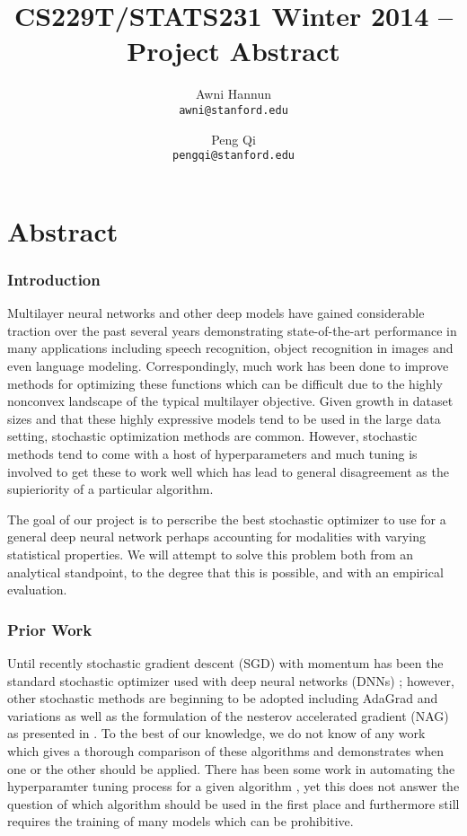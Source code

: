 \documentclass[12pt,english]{article}
\title{
CS229T/STATS231 Winter 2014 -- Project Abstract
}
\author{
Awni Hannun \\
\texttt{awni@stanford.edu}
\and
Peng Qi \\
\texttt{pengqi@stanford.edu}
}
\newcommand{\1}{\mathbb{I}} %
\begin{document}
\maketitle

\section*{Abstract}

\subsubsection*{Introduction}

Multilayer neural networks and other deep models have gained considerable traction over the past several
years demonstrating state-of-the-art performance in many applications including
speech recognition, object recognition in images and even language modeling.
Correspondingly, much work has been done to improve methods for optimizing
these functions which can be difficult due to the highly nonconvex landscape of
the typical multilayer objective. Given growth in dataset sizes and that these
highly expressive models tend to be used in the large data setting, stochastic
optimization methods are common. However, stochastic methods tend to come with
a host of hyperparameters and much tuning is involved to get these to work well
which has lead to general disagreement as the supieriority of a particular
algorithm. 

The goal of our project is to perscribe the best stochastic optimizer to use
for a general deep neural network perhaps accounting for modalities with
varying statistical properties. We will attempt to solve this problem both from an 
analytical standpoint, to the degree that this is possible, and with an empirical
evaluation. 

\subsubsection*{Prior Work}\label{prior_work}

Until recently stochastic gradient descent (SGD) with momentum has been the
standard stochastic optimizer used with deep neural networks (DNNs)
\cite{hinton_guide_tr}; however, other stochastic methods are beginning to be
adopted including AdaGrad \cite{duchi_adagrad} and variations as well as the
formulation of the nesterov accelerated gradient (NAG) as presented in
\cite{sutskever_nag}. To the best of our knowledge, we do not know of any work
which gives a thorough comparison of these algorithms and demonstrates when one
or the other should be applied. There has been some work in automating the
hyperparamter tuning process for a given algorithm \cite{snoek_bayes}, yet this
does not answer the question of which algorithm should be used in the first
place and furthermore still requires the training of many models which can be
prohibitive. 
\end{document}
